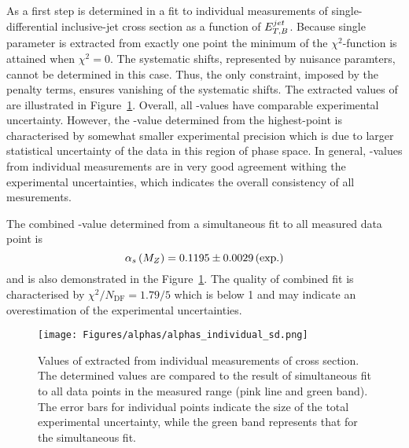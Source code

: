 As a first step \asz is determined in a fit to individual measurements of single-differential inclusive-jet cross section as a function of $\mbox{$E_{T,B}^{jet}$}$. Because single parameter is extracted from exactly one point the minimum of the $\chi^2$-function is attained when $\chi^2=0$. The systematic shifts, represented by nuisance paramters, cannot be determined in this case. Thus, the only constraint, imposed by the penalty terms, ensures vanishing of the systematic shifts. The extracted values of \asz are illustrated in Figure~\ref{fig:alphassinglediffindividual}. Overall, all \as-values have comparable experimental uncertainty. However, the \as-value determined from the highest-\etjetb point is characterised by somewhat smaller experimental precision which is due to larger statistical uncertainty of the data in this region of phase space. In general, \as-values from individual measurements are in very good agreement withing the experimental uncertainties, which indicates the overall consistency of all mesurements.

The combined \asz-value determined from a simultaneous fit to all measured data point is
\begin{equation}
 \asz = 0.1195 \pm 0.0029 \left( \text{exp.} \right) %
 \label{eq:assingledifval}
\end{equation}
and is also demonstrated in the Figure~\ref{fig:alphassinglediffindividual}. The quality of combined fit is characterised by $\chi^2/N_\text{DF}=1.79/5$ which is below 1 and may indicate an overestimation of the experimental uncertainties.

\begin{figure}[tp]
 \begin{center}
 \texttt{[image: Figures/alphas/alphas\_individual\_sd.png]}
\end{center}
 \caption{Values of \asz extracted from individual measurements of \dsdetjetb cross section. The determined values are compared to the result of simultaneous fit to all data points in the measured \etjetb range (pink line and green band). The error bars for individual points indicate the size of the total experimental uncertainty, while the green band represents that for the simultaneous fit.}
 \label{fig:alphassinglediffindividual}
\end{figure}


